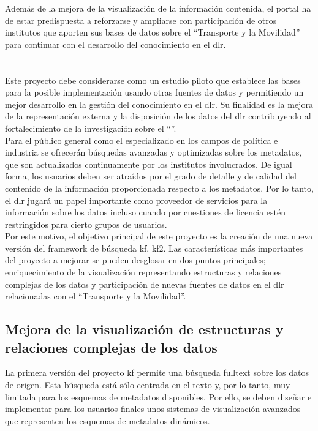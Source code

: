 Además de la mejora de la visualización de la información contenida, el portal ha de estar predispuesta a reforzarse y ampliarse con participación de otros institutos que aporten sus bases de datos sobre el ``Transporte y la Movilidad'' para continuar con el desarrollo del conocimiento en el \gls{dlr}.


\section{}
\label{section:alcance}

Este proyecto debe considerarse como un estudio piloto que establece las bases para la posible implementación usando otras fuentes de datos y permitiendo un mejor desarrollo en la gestión del conocimiento en el \gls{dlr}. Su finalidad es la mejora de la representación externa y la disposición de los datos del \gls{dlr} contribuyendo al fortalecimiento de la investigación sobre el ``\transmov''.\\

Para el público general como el especializado en los campos de política e industria se ofrecerán búsquedas avanzadas y optimizadas sobre los \glspl{metadato}, que son actualizados continuamente por los institutos involucrados. De igual forma, los usuarios deben ser atraídos por el grado de detalle y de calidad del contenido de la información proporcionada respecto a los  \glspl{metadato}. Por lo tanto, el \gls{dlr} jugará un papel importante como proveedor de servicios para la información sobre los datos incluso cuando por cuestiones de licencia estén restringidos para cierto grupos de usuarios.\\

Por este motivo, el objetivo principal de este proyecto es la creación de una nueva versión del \gls{framework} de búsqueda \gls{kf}, \gls{kf2}. Las  características más importantes del proyecto a mejorar se pueden desglosar en dos puntos principales; enriquecimiento de la visualización representando  estructuras y relaciones complejas de los datos y participación de nuevas fuentes de datos en el \gls{dlr} relacionadas con  el ``Transporte y la Movilidad''.\\
\subsection{Mejora de la visualización de estructuras y relaciones complejas de los datos}

La primera versión del proyecto \gls{kf} permite una búsqueda \gls{fulltext} sobre los datos de origen. Esta búsqueda está sólo centrada en el texto y, por lo tanto, muy limitada para los esquemas de \glspl{metadato} disponibles. Por ello, se deben diseñar e implementar para los usuarios finales unos sistemas de visualización avanzados que representen los esquemas de \glspl{metadato} dinámicos.\\

